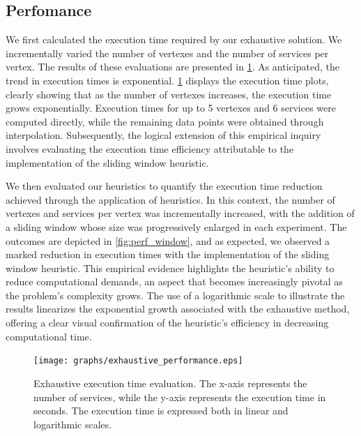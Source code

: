 \subsection{Perfomance}\label{subsec:experiments_performance}
We first calculated the execution time required by our exhaustive solution.
We incrementally varied the number of vertexes and the number of services per vertex.
The results of these evaluations are presented in \cref{fig:perf_exhaustive}.
As anticipated, the trend in execution times is exponential. \cref{fig:perf_exhaustive} displays the execution time plots,
clearly showing that as the number of vertexes increases, the execution time grows exponentially.
Execution times for up to 5 vertexes and 6 services were computed directly,
while the remaining data points were obtained through interpolation.
Subsequently, the logical extension of this empirical inquiry involves evaluating the execution time efficiency attributable to the implementation of the sliding window heuristic.

We then evaluated our heuristics to quantify the execution time reduction achieved through the application of heuristics.
In this context, the number of vertexes and services per vertex was incrementally increased,
with the addition of a sliding window whose size was progressively enlarged in each experiment.
The outcomes are depicted in \cref{fig:perf_window}, and as expected,
we observed a marked reduction in execution times with the implementation of the sliding window heuristic.
This empirical evidence highlights the heuristic's ability to reduce computational demands,
an aspect that becomes increasingly pivotal as the problem's complexity grows.
The use of a logarithmic scale to illustrate the results linearizes the exponential growth associated with the exhaustive method,
offering a clear visual confirmation of the heuristic's efficiency in decreasing computational time.
\begin{figure}[htb!]
  \texttt{[image: graphs/exhaustive\_performance.eps]}
  \caption{Exhaustive execution time evaluation. The x-axis represents the number of services, while the y-axis represents the execution time in seconds. The execution time is expressed both in linear and logarithmic scales.}
  \label{fig:perf_exhaustive}
\end{figure}


